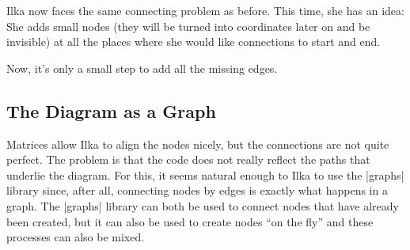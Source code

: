 Ilka now faces the same connecting problem as before. This time, she has an
idea: She adds small nodes (they will be turned into coordinates later on and
be invisible) at all the places where she would like connections to start and
end.
%
\begin{codeexample}[preamble={\usetikzlibrary{shapes.misc}}]
\end{codeexample}
%
Now, it's only a small step to add all the missing edges.


\subsection{The Diagram as a Graph}

Matrices allow Ilka to align the nodes nicely, but the connections are not
quite perfect. The problem is that the code does not really reflect the paths
that underlie the diagram. For this, it seems natural enough to Ilka to use the
|graphs| library since, after all, connecting nodes by edges is exactly what
happens in a graph. The |graphs| library can both be used to connect nodes that
have already been created, but it can also be used to create nodes ``on the
fly'' and these processes can also be mixed.


